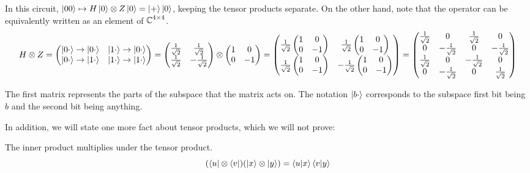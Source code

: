 In this circuit, $\ket{00} \mapsto H\ket{0} \otimes Z\ket{0} = \ket{+}\ket{0}$, keeping the tensor products separate.
On the other hand, note that the operator can be equivalently written as an element of $\operatorname{\mathbb{C}}^{4\times 4}$.
\[ H \otimes Z = \begin{pmatrix}
    \ket{0 \cdot} \to \ket{0 \cdot} & \ket{1 \cdot} \to \ket{0 \cdot} \\
    \ket{0 \cdot} \to \ket{1 \cdot} & \ket{1 \cdot} \to \ket{1 \cdot}
\end{pmatrix} = \begin{pmatrix}
    \frac{1}{\sqrt{2}} & \frac{1}{\sqrt{2}} \\ \frac{1}{\sqrt{2}} & -\frac{1}{\sqrt{2}}
\end{pmatrix} \otimes \begin{pmatrix}
    1 & 0 \\ 0 & -1
\end{pmatrix} = \begin{pmatrix}
    \frac{1}{\sqrt{2}} \begin{pmatrix}
        1 & 0 \\ 0 & -1
    \end{pmatrix} & \frac{1}{\sqrt{2}} \begin{pmatrix}
        1 & 0 \\ 0 & -1
    \end{pmatrix} \\
    \frac{1}{\sqrt{2}} \begin{pmatrix}
        1 & 0 \\ 0 & -1
    \end{pmatrix} & -\frac{1}{\sqrt{2}} \begin{pmatrix}
        1 & 0 \\ 0 & -1
    \end{pmatrix} \\
\end{pmatrix} = \begin{pmatrix}
    \frac{1}{\sqrt{2}} & 0 & \frac{1}{\sqrt{2}} & 0 \\ 0 & -\frac{1}{\sqrt{2}} & 0 & -\frac{1}{\sqrt{2}} \\ \frac{1}{\sqrt{2}} & 0 & -\frac{1}{\sqrt{2}} & 0 \\ 0 & -\frac{1}{\sqrt{2}} & 0 & \frac{1}{\sqrt{2}}
\end{pmatrix} \]

The first matrix represents the parts of the subspace that the matrix acts on. The notation $\ket{b \cdot}$ corresponds to the subspace first bit being $b$ and the second bit being anything.

In addition, we will state one more fact about tensor products, which we will not prove:
\begin{theorem}
    The inner product multiplies under the tensor product.
    \[ (\bra{u} \otimes \bra{v})(\ket{x} \otimes \ket{y}) = \braket{u}{x} \braket{v}{y}\]
\end{theorem}

